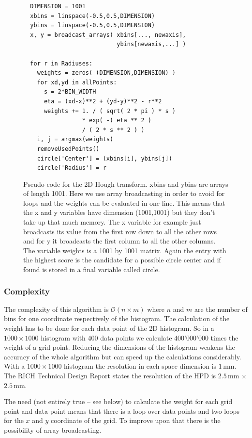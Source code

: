 \documentclass[11pt,twoside]{scrreprt}
\begin{document}
\begin{figure}[htb]
\begin{lstlisting}
  DIMENSION = 1001
  xbins = linspace(-0.5,0.5,DIMENSION)
  ybins = linspace(-0.5,0.5,DIMENSION)
  x, y = broadcast_arrays( xbins[..., newaxis], 
                           ybins[newaxis,...] )

  for r in Radiuses:
    weights = zeros( (DIMENSION,DIMENSION) )
    for xd,yd in allPoints:
      s = 2*BIN_WIDTH
      eta = (xd-x)**2 + (yd-y)**2 - r**2      
      weights += 1. / ( sqrt( 2 * pi ) * s ) 
                 * exp( -( eta ** 2 ) 
                 / ( 2 * s ** 2 ) )
    i, j = argmax(weights)
    removeUsedPoints()
    circle['Center'] = (xbins[i], ybins[j])
    circle['Radius'] = r
\end{lstlisting}
  \caption[Pseudo code 2D HT]{Pseudo code for the 2D Hough transform. xbins and ybins are arrays of length 1001. Here we use array 
  broadcasting in order to avoid for loops and the weights can be evaluated in one line. This means that the x and y variables have 
  dimension (1001,1001) but they don't take up that much memory. The x variable for example just broadcasts its value from the first 
  row down to all the other rows and for y it broadcasts the first column to all the other columns. The variable weights is a 1001 by 
  1001 matrix. Again the entry with the highest score is the candidate for a possible circle center and if found is stored in a final 
  variable called circle.}
\end{figure}


\subsubsection{Complexity} %
\label{ssub:complexity_2d}
The complexity of this algorithm is $\mathcal{O}(n\times m)$ where $n$ and $m$ are the number of bins for one coordinate respectively of 
the histogram. The calculation of the weight has to be done for each data point of the 2D histogram. So in a $1000\times 1000$ histogram 
with 400 data points we calculate 400'000'000 times the weight of a grid point. Reducing the dimensions of the histogram weakens the 
accuracy of the whole algorithm but can speed up the calculations considerably. With a $1000\times 1000$ histogram the resolution in each 
space dimension is $1$\,mm. The RICH Technical Design Report states the resolution of the HPD is $2.5$\,mm $\times$ $2.5$\,mm.

The need (not entirely true -- see below) to calculate the weight for each grid point and data point means that there is a loop over 
data points and two loops for the $x$ and $y$ coordinate of the grid. To improve upon that there is the possibility of array broadcasting.
\end{document}
